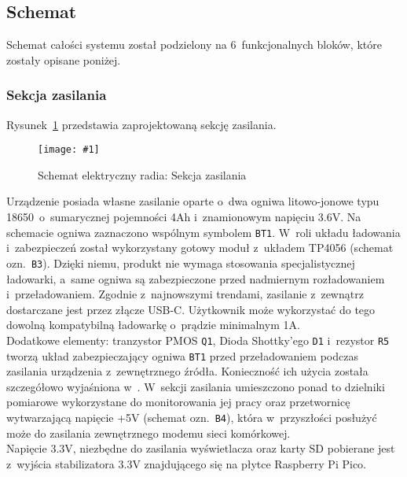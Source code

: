 \documentclass[polish]{aghengthesis}
\newcommand{\imgint}[4]{
	\begin{figure}[{#4}]
		\centering
		\texttt{[image: \#1]}
		\caption{#2}
		\label{#1}
	\end{figure}
}
\newcommand{\imgh}[3]{\imgint{#1}{#2}{#3}{H}}
\begin{document}
		\subsection{Schemat}

			Schemat całości systemu został podzielony na 6~funkcjonalnych bloków, które zostały opisane poniżej.
			
			\subsubsection{Sekcja zasilania}
				Rysunek~\ref{3/hw_kicad_sch_power} przedstawia zaprojektowaną sekcję zasilania.
				\imgh{3/hw_kicad_sch_power}{Schemat elektryczny radia: Sekcja zasilania}{0.95}
				
				Urządzenie posiada własne zasilanie oparte o~dwa ogniwa litowo-jonowe typu 18650~o~sumarycznej pojemności 4Ah i~znamionowym napięciu 3.6V. Na schemacie ogniwa zaznaczono wspólnym symbolem \lstinline|BT1|. W~roli układu ładowania i~zabezpieczeń został wykorzystany gotowy moduł z~układem TP4056\textsuperscript{\cite{hw_chg}} (schemat ozn.~\lstinline|B3|). Dzięki niemu, produkt nie wymaga stosowania specjalistycznej ładowarki, a~same ogniwa są zabezpieczone przed nadmiernym rozładowaniem i~przeładowaniem. Zgodnie z~najnowszymi trendami, zasilanie z~zewnątrz dostarczane jest przez złącze USB-C. Użytkownik może wykorzystać do tego dowolną kompatybilną ładowarkę o~prądzie minimalnym 1A.
				$ $\\
				
				Dodatkowe elementy: tranzystor PMOS \lstinline|Q1|, Dioda Shottky'ego \lstinline|D1| i~rezystor \lstinline|R5| tworzą układ zabezpieczający ogniwa \lstinline|BT1| przed przeładowaniem podczas  zasilania urządzenia z~zewnętrznego źródła. Konieczność ich użycia została szczegółowo wyjaśniona w~\cite{hw_load_sw}. W~sekcji zasilania umieszczono ponad to dzielniki pomiarowe wykorzystane do monitorowania jej pracy oraz przetwornicę wytwarzającą napięcie +5V (schemat ozn.~\lstinline|B4|), która w~przyszłości posłużyć może do zasilania zewnętrznego modemu sieci komórkowej.
				$ $\\
				
				Napięcie 3.3V, niezbędne do zasilania wyświetlacza oraz karty SD pobierane jest z~wyjścia stabilizatora 3.3V znajdującego się na płytce Raspberry Pi Pico.
				
\end{document}
